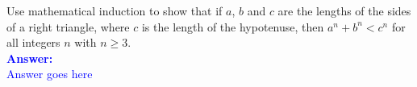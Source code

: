 \item{}
Use mathematical induction to show that if $a$, $b$ and $c$ are the lengths
of the sides of a right triangle, where $c$ is the length of the hypotenuse,
then $a^n + b^n < c^n$ for all integers $n$ with $n\ge3$.
\\[12pt]
\ifanswers
\textcolor{blue}{
\textbf{Answer:}\\[6pt]
Answer goes here
}
\newpage
\fi
